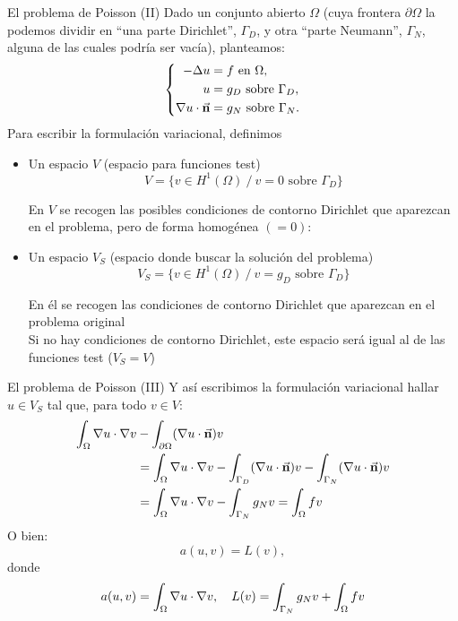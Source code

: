 \documentclass[9pt, dvipsnames]{beamer}
\begin{document}
\begin{frame}{El problema de Poisson (II)}
  Dado un conjunto abierto $\Omega$ (cuya frontera $\partial\Omega$ la
  podemos dividir en ``una parte Dirichlet'', $\Gamma_D$, y otra
  ``parte Neumann'', $\Gamma_N$, alguna de las cuales podría ser
  vacía), planteamos:
  \begin{equation*}
    \left\{
    \begin{aligned}
      -\Delta u &= f \text{ en } \Omega, \\
      u&=g_D \text{ sobre } \Gamma_D, \\
      \nabla u \cdot \vec{\mathbf{n}} &=g_N \text{ sobre } \Gamma_N.
    \end{aligned}
    \right.
  \end{equation*}
  Para escribir la formulación variacional, definimos
  \begin{itemize}
  \item Un espacio $V$ (espacio para funciones test)
    $$ V = \{ v\in H^1(\Omega) \ / \ v=0 \text{ sobre } {\Gamma_D} \}$$
    \begin{flushright}\small
    En $V$ se recogen las posibles condiciones de contorno
      Dirichlet que aparezcan en el problema, pero de forma homogénea
      $(=0)$:
    \end{flushright}
\item Un espacio $V_{S}$ (espacio donde buscar la solución del problema)
    $$ V_S = \{ v\in H^1(\Omega) \ / \ v=g_D \text{ sobre } {\Gamma_D} \}$$
    \begin{flushright}\small
    En él se recogen las condiciones de contorno
      Dirichlet que aparezcan en el problema original
      \\
      Si no hay condiciones de contorno Dirichlet, este
      espacio será igual al de las funciones test ($V_S=V$)
    \end{flushright}
  \end{itemize}
\end{frame}

\begin{frame}{El problema de Poisson (III)}
  Y así escribimos la formulación variacional hallar $u\in V_S$ tal
  que, para todo $v\in V$:
  \begin{align*}
      \int_\Omega \nabla u \cdot \nabla v
      &- \int_{\partial\Omega} (\nabla u \cdot \vec{\mathbf{n}}) v
      \\
      &=\int_\Omega \nabla u \cdot \nabla v
      - \int_{\Gamma_D} (\nabla u \cdot \vec{\mathbf{n}}) v
      - \int_{\Gamma_N} (\nabla u \cdot \vec{\mathbf{n}}) v
      \\
      &=\int_\Omega \nabla u \cdot \nabla v
      - \int_{\Gamma_N} g_N v
      = \int_\Omega  f v
    \end{align*}
    O bien:
    $$
    a(u,v) = L(v),
    $$
    donde
    \begin{equation*}
      a(u,v)=\int_\Omega \nabla u \cdot \nabla v,
      \quad
      L(v)=  \int_{\Gamma_N} g_N v + \int_\Omega  f v
    \end{equation*}
\end{frame}
\end{document}

